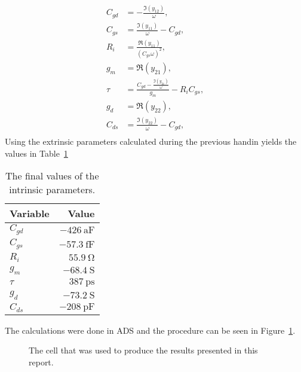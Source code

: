 \documentclass[12pt,a4paper]{article}
\begin{document}
\begin{subequations}
  \label{eq:in_param_solve}
  \begin{align}
    C_{gd} &= -\frac{\Im(y_{12})}{\omega}, \label{eq:in_param_solve_cgd}\\
    C_{gs} &= \frac{\Im(y_{11})}{\omega}-C_{gd}, \label{eq:in_param_solve_cgs}\\
    R_i &= \frac{\Re(y_{11})}{(C_{gs}\omega)^2}, \label{eq:in_param_solve_ri}\\
    g_m &= \Re(y_{21}), \label{eq:in_param_solve_gm}\\
    \tau &= \frac{C_{gd}-\frac{\Im(y_{21})}{\omega}}{g_m}-R_iC_{gs}, \label{eq:in_param_solve_tau}\\
    g_d &= \Re(y_{22}), \label{eq:in_param_solve_gd}\\
    C_{ds} &= \frac{\Im(y_{22})}{\omega}-C_{gd}, \label{eq:in_param_solve_cds}\\
  \end{align}
\end{subequations}
Using the extrinsic parameters calculated during the previous handin yields the values in Table~\ref{tab:in_vals}
\begin{table}
  \centering
  \begin{tabular}{|l|r|}\hline
    Variable & Value \\ \hline
    $C_{gd}$ & $\SI{-426}{\atto\farad}$ \\
    $C_{gs}$ & $\SI{-57.3}{\femto\farad}$ \\
    $R_i$ & $\SI{55.9}{\ohm}$ \\
    $g_m$ & $\SI{-68.4}{\siemens}$ \\
    $\tau$ & $\SI{387}{\pico\second}$ \\
    $g_d$ & $\SI{-73.2}{\siemens}$ \\
    $C_{ds}$ & $\SI{-208}{\pico\farad}$ \\ \hline
  \end{tabular}
  \caption{The final values of the intrinsic parameters.}
  \label{tab:in_vals}
\end{table}

The calculations were done in ADS and the procedure can be seen in Figure~\ref{fig:calcs}.
\begin{figure}
  \centering
  \noindent{}
  \caption{The cell that was used to produce the results presented in this report.}
  \label{fig:calcs}
\end{figure}
\end{document}
